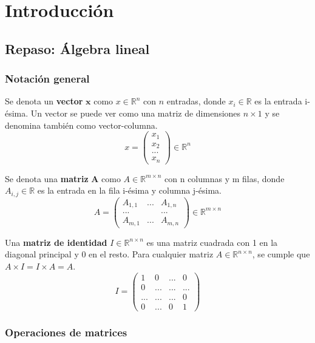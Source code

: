 \chapter{Introducción}
\section{Repaso: Álgebra lineal}
\subsection{Notación general}
Se denota un \textbf{vector} $\mathrm{\textbf{x}}$ como $x \in \mathbb{R}^n$ con $n$ entradas, donde $x_i \in \mathbb{R}$ es la entrada i-ésima. Un vector se puede ver como una matriz de dimensiones $n \times 1$ y se denomina también como vector-columna.
$$x = \begin{pmatrix}
x_1 \\ x_2 \\ ... \\ x_n
\end{pmatrix} \in \mathbb{R}^n$$

Se denota una \textbf{matriz} $\mathrm{\textbf{A}}$ como $A \in \mathbb{R}^{m \times n}$ con n columnas y m filas, donde $A_{i,j} \in \mathbb{R}$ es la entrada en la fila i-ésima y columna j-ésima.
$$A = \begin{pmatrix}
A_{1,1} & ... & A_{1,n} \\
... & & ...\\
A_{m,1} & ... & A_{m,n}
\end{pmatrix} \in \mathbb{R}^{m \times n}$$

Una \textbf{matriz de identidad} $I \in \mathbb{R}^{n \times n}$ es una matriz cuadrada con 1 en la diagonal principal y 0 en el resto. Para cualquier matriz $A \in \mathbb{R}^{n \times n}$, se cumple que $A \times I = I \times A = A$.
$$I = \begin{pmatrix}
1 & 0 & ... & 0 \\
0 & ... & ... & ... \\
... & ... & ... & 0 \\
0 & ... & 0 & 1
\end{pmatrix}$$

\subsection{Operaciones de matrices}
